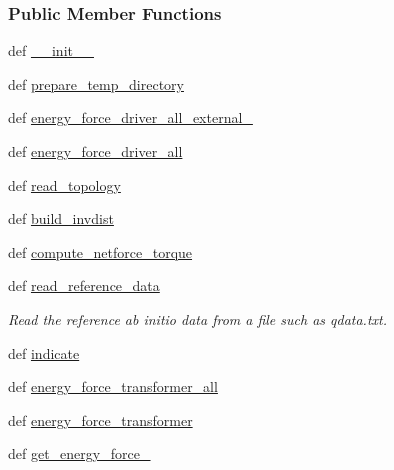 \subsubsection*{Public Member Functions}
\begin{DoxyCompactItemize}
\item 
def \hyperlink{classforcebalance_1_1amberio_1_1AbInitio__AMBER_ab4a2fcc38e45455b90ada9daedcb180c}{\-\_\-\-\_\-init\-\_\-\-\_\-}
\item 
def \hyperlink{classforcebalance_1_1amberio_1_1AbInitio__AMBER_a1d224b2406545021d839c6189a0a4cdb}{prepare\-\_\-temp\-\_\-directory}
\item 
def \hyperlink{classforcebalance_1_1amberio_1_1AbInitio__AMBER_ad0fcc43d857471ee074361076c040ea5}{energy\-\_\-force\-\_\-driver\-\_\-all\-\_\-external\-\_\-}
\item 
def \hyperlink{classforcebalance_1_1amberio_1_1AbInitio__AMBER_a64ccf943e550392c654ec7bb6c6ff81b}{energy\-\_\-force\-\_\-driver\-\_\-all}
\item 
def \hyperlink{classforcebalance_1_1abinitio_1_1AbInitio_a9f405c452a0a4081cd7da07938520920}{read\-\_\-topology}
\item 
def \hyperlink{classforcebalance_1_1abinitio_1_1AbInitio_a7475857193eefd4edd020d4f2a8fec17}{build\-\_\-invdist}
\item 
def \hyperlink{classforcebalance_1_1abinitio_1_1AbInitio_afbf86c26158a68cae7460b4106809fdd}{compute\-\_\-netforce\-\_\-torque}
\item 
def \hyperlink{classforcebalance_1_1abinitio_1_1AbInitio_aa73bedbf1e2cf19f2fa1e88815f1bd86}{read\-\_\-reference\-\_\-data}
\begin{DoxyCompactList}\small\item\em Read the reference ab initio data from a file such as qdata.\-txt. \end{DoxyCompactList}\item 
def \hyperlink{classforcebalance_1_1abinitio_1_1AbInitio_a3260db78e8c174f04a64661c4e5c181c}{indicate}
\item 
def \hyperlink{classforcebalance_1_1abinitio_1_1AbInitio_a3d28520925c6dfd179647d0abf7e1368}{energy\-\_\-force\-\_\-transformer\-\_\-all}
\item 
def \hyperlink{classforcebalance_1_1abinitio_1_1AbInitio_a9167da321a9fff748eef5ebe754cc7ca}{energy\-\_\-force\-\_\-transformer}
\item 
def \hyperlink{classforcebalance_1_1abinitio_1_1AbInitio_a313c848f46579817803c8a3ff100974e}{get\-\_\-energy\-\_\-force\-\_\-}

\end{DoxyCompactItemize}
